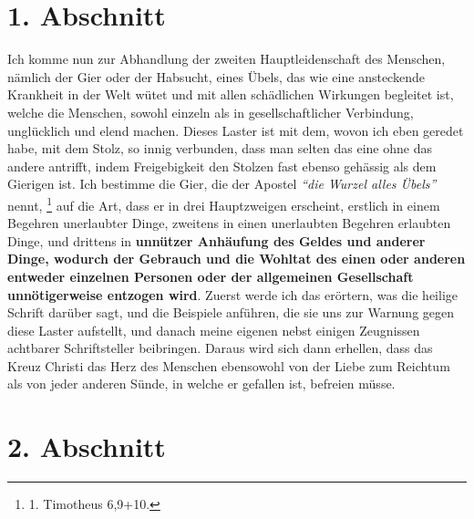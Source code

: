 \newpage

\section{1. Abschnitt} \label{kap13_ab1}

Ich komme nun zur Abhandlung der zweiten Hauptleidenschaft des Menschen, nämlich
der Gier oder der Habsucht, eines Übels, das wie
eine ansteckende Krankheit
in der Welt wütet und mit allen schädlichen Wirkungen begleitet ist, welche
die Menschen, sowohl einzeln als in gesellschaftlicher Verbindung, unglücklich
und elend machen. Dieses Laster ist mit dem, wovon ich eben geredet habe, mit
dem Stolz, so innig verbunden, dass man selten das eine ohne das andere
antrifft, indem Freigebigkeit den Stolzen fast ebenso gehässig als dem
Gierigen ist. Ich bestimme die Gier, die der Apostel
\textit{"`die Wurzel alles
Übels"'} nennt,
\footnote{1. Timotheus 6,9+10.}
auf die Art, dass er in drei
Hauptzweigen erscheint, erstlich in einem Begehren unerlaubter Dinge, zweitens
in einen unerlaubten Begehren erlaubten Dinge, und drittens in
\label{ref:13_01_accumlation} \textbf{unnützer
Anhäufung des Geldes und anderer Dinge, wodurch der Gebrauch und die Wohltat
des einen oder anderen entweder einzelnen Personen oder der allgemeinen
Gesellschaft unnötigerweise entzogen wird}. Zuerst
werde ich das erörtern, was
die heilige Schrift darüber sagt, und die Beispiele anführen, die sie uns zur
Warnung gegen diese Laster aufstellt, und danach meine eigenen nebst einigen
Zeugnissen achtbarer Schriftsteller beibringen. Daraus wird sich dann erhellen, dass
das Kreuz Christi das Herz des Menschen ebensowohl von der Liebe zum Reichtum
als von jeder anderen Sünde, in welche er gefallen ist, befreien müsse.

\section{2. Abschnitt} \label{kap13_ab2}

